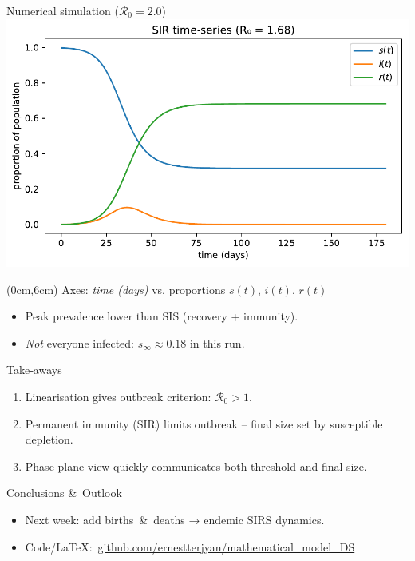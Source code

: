\documentclass[14pt,aspectratio=169]{beamer}
\newcommand{\RR}{\mathcal{R}_0}
\begin{document}
\begin{frame}{Numerical simulation ($\RR=2.0$)}
  \centering
  \includegraphics{SIR_Timeseries.pdf}
  \begin{textblock*}{\textwidth}(0cm,6cm)
    {\scriptsize Axes: \emph{time (days)} vs. proportions $s(t)$, $i(t)$, $r(t)$}
  \end{textblock*}
  \vspace{0.4em}
  \begin{itemize}
    \item Peak prevalence lower than SIS (recovery + immunity).
    \item \emph{Not} everyone infected: $s_\infty\approx0.18$ in this run.
  \end{itemize}
\end{frame}
\begin{frame}{Take‑aways}
  \begin{enumerate}
    \item Linearisation gives outbreak criterion: \alert{$\RR>1$}.
    \item Permanent immunity (SIR) limits outbreak – final size set by susceptible depletion.
    \item Phase‑plane view quickly communicates both threshold and final size.
  \end{enumerate}
\end{frame}

\begin{frame}{Conclusions \& Outlook}
  \begin{itemize}
    \item Next week: add births \& deaths → endemic SIRS dynamics.
    \item Code/\LaTeX:\ \href{https://github.com/ernestterjyan/mathematical_model_DS}{github.com/ernestterjyan/mathematical\_model\_DS}
  \end{itemize}
  \vfill
\end{frame}
\end{document}
